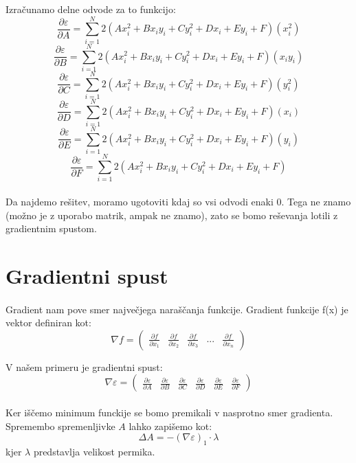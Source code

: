 \documentclass[a4paper, 12pt]{article}
\begin{document}
	Izračunamo delne odvode za to funkcijo:
	$$\frac{\partial \varepsilon}{\partial A} = \sum_{i=1}^{N}2(Ax_i^2 + Bx_iy_i + Cy_i^2 + Dx_i + Ey_i + F)(x_i^2)$$
	$$\frac{\partial \varepsilon}{\partial B} = \sum_{i=1}^{N}2(Ax_i^2 + Bx_iy_i + Cy_i^2 + Dx_i + Ey_i + F)(x_iy_i)$$
	$$\frac{\partial \varepsilon}{\partial C} = \sum_{i=1}^{N}2(Ax_i^2 + Bx_iy_i + Cy_i^2 + Dx_i + Ey_i + F)(y_i^2)$$
	$$\frac{\partial \varepsilon}{\partial D} = \sum_{i=1}^{N}2(Ax_i^2 + Bx_iy_i + Cy_i^2 + Dx_i + Ey_i + F)(x_i)$$
	$$\frac{\partial \varepsilon}{\partial E} = \sum_{i=1}^{N}2(Ax_i^2 + Bx_iy_i + Cy_i^2 + Dx_i + Ey_i + F)(y_i)$$
	$$\frac{\partial \varepsilon}{\partial F} = \sum_{i=1}^{N}2(Ax_i^2 + Bx_iy_i + Cy_i^2 + Dx_i + Ey_i + F)$$

	\paragraph{}
	Da najdemo rešitev, moramo ugotoviti kdaj so vsi odvodi enaki 0. Tega ne znamo (možno je z uporabo matrik, ampak ne znamo), zato se bomo reševanja lotili z gradientnim spustom.

	\section*{Gradientni spust}
	\paragraph{}
	Gradient nam pove smer največjega naraščanja funkcije. Gradient funkcije f(x) je vektor definiran kot:
	$$\nabla f = \begin{pmatrix}\frac{\partial f}{\partial x_{1}} & \frac{\partial f}{\partial x_{2}} & \frac{\partial f}{\partial x_{3}} & ... & \frac{\partial f}{\partial x_{n}}\end{pmatrix}$$

	V našem primeru je gradientni spust:
	$$\nabla \varepsilon =
	\begin{pmatrix}
	\frac{\partial \varepsilon}{\partial A} &
	\frac{\partial \varepsilon}{\partial B} &
	\frac{\partial \varepsilon}{\partial C} &
	\frac{\partial \varepsilon}{\partial D} &
	\frac{\partial \varepsilon}{\partial E} &
	\frac{\partial \varepsilon}{\partial F}
	\end{pmatrix}$$

	\paragraph{}
	Ker iščemo minimum funckije se bomo premikali v nasprotno smer gradienta. Spremembo spremenljivke $A$ lahko zapišemo kot:
	$$\Delta A = -(\nabla \varepsilon)_1 \cdot \lambda$$
	kjer $\lambda$ predstavlja velikost permika.
\end{document}
